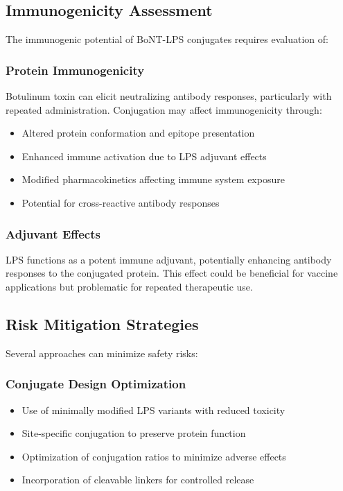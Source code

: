 \documentclass[11pt,a4paper]{article}
\begin{document}
\subsection{Immunogenicity Assessment}

The immunogenic potential of BoNT-LPS conjugates requires evaluation of:

\subsubsection{Protein Immunogenicity}

Botulinum toxin can elicit neutralizing antibody responses, particularly with repeated administration. Conjugation may affect immunogenicity through:
\begin{itemize}
\item Altered protein conformation and epitope presentation
\item Enhanced immune activation due to LPS adjuvant effects
\item Modified pharmacokinetics affecting immune system exposure
\item Potential for cross-reactive antibody responses
\end{itemize}

\subsubsection{Adjuvant Effects}

LPS functions as a potent immune adjuvant, potentially enhancing antibody responses to the conjugated protein. This effect could be beneficial for vaccine applications but problematic for repeated therapeutic use.

\subsection{Risk Mitigation Strategies}

Several approaches can minimize safety risks:

\subsubsection{Conjugate Design Optimization}

\begin{itemize}
\item Use of minimally modified LPS variants with reduced toxicity
\item Site-specific conjugation to preserve protein function
\item Optimization of conjugation ratios to minimize adverse effects
\item Incorporation of cleavable linkers for controlled release
\end{itemize}
\end{document}
